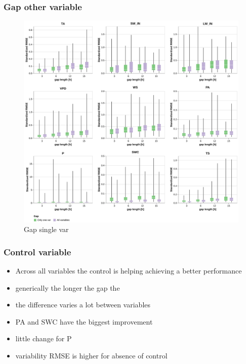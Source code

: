 \documentclass{article}
\newcommand{\imgwidth}{6in}
\begin{document}


\subsubsection{Gap other variable}

\begin{figure}
\centerline{\includegraphics[width=\imgwidth]{gap_single_var}}
\caption{Gap single var}
\label{fig:gap_single_var}
\end{figure}



\subsubsection{Control variable}

\begin{itemize}
    \item Across all variables the control is helping achieving a better performance
    \item generically the longer the gap the 
    \item the difference varies a lot between variables
    \item PA and SWC have the biggest improvement
    \item little change for P
    \item variability RMSE is higher for absence of control
\end{itemize}
\end{document}
